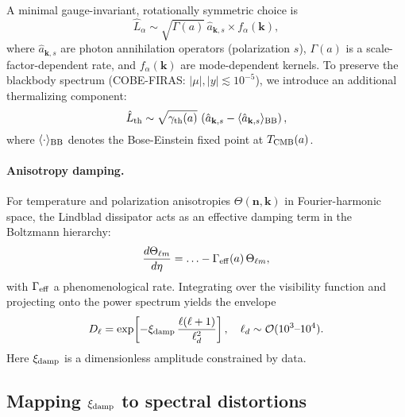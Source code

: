 \documentclass[11pt]{article}
\begin{document}
A minimal gauge-invariant, rotationally symmetric choice is
\begin{equation}
\hat{L}_\alpha \sim \sqrt{\Gamma(a)}\, \hat{a}_{\mathbf{k},s} 
\times f_\alpha(\mathbf{k}),
\end{equation}
where $\hat{a}_{\mathbf{k},s}$ are photon annihilation operators (polarization $s$), 
$\Gamma(a)$ is a scale-factor-dependent rate, and $f_\alpha(\mathbf{k})$ are mode-dependent kernels.
To preserve the blackbody spectrum (COBE-FIRAS: $|\mu|,|y|\lesssim 10^{-5}$), we introduce an additional thermalizing component:
\begin{equation}
\hat{L}_{\rm th} \sim \sqrt{\gamma_{\rm th}(a)}\, 
\left(\hat{a}_{\mathbf{k},s} - \langle \hat{a}_{\mathbf{k},s}\rangle_{\rm BB}\right),
\end{equation}
where $\langle\cdot\rangle_{\rm BB}$ denotes the Bose-Einstein fixed point at $T_{\rm CMB}(a)$.

\paragraph{Anisotropy damping.}
For temperature and polarization anisotropies $\Theta(\mathbf{n},\mathbf{k})$ in Fourier-harmonic space,
the Lindblad dissipator acts as an effective damping term in the Boltzmann hierarchy:
\begin{equation}
\frac{d\Theta_{\ell m}}{d\eta} = \ldots - \Gamma_{\rm eff}(a)\,\Theta_{\ell m},
\end{equation}
with $\Gamma_{\rm eff}$ a phenomenological rate.
Integrating over the visibility function and projecting onto the power spectrum yields the envelope
\begin{equation}
D_\ell = \exp\!\left[-\xi_{\rm damp}\,\frac{\ell(\ell+1)}{\ell_d^2}\right],
\quad \ell_d \sim {\cal O}(10^3\text{--}10^4).
\label{eq:envelope}
\end{equation}
Here $\xi_{\rm damp}$ is a dimensionless amplitude constrained by data.

\subsection{Mapping $\xi_{\rm damp}$ to spectral distortions}
\end{document}
